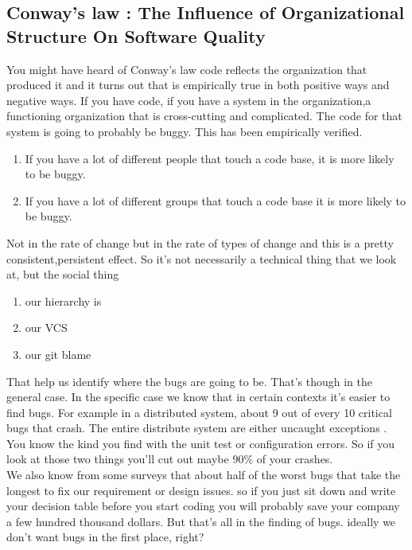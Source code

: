 \documentclass[14pt]{extreport}
\begin{document}
\subsection{Conway's law : The Influence of Organizational Structure On Software Quality}
You might have heard of Conway's law code reflects the organization that produced it and it
turns out that is empirically true in both positive ways and negative ways.
If you have code, if you have a system in the organization,a functioning organization that is cross-cutting and complicated.
The code for that system is going to probably be buggy. 
This has been empirically verified. 
\begin{enumerate}
	\item If you have a lot of different people that touch a code base, it is more likely to be buggy.
	\item If you have a lot of different groups that touch a code base it is more likely to be buggy. 
\end{enumerate}
Not in the rate of change but in the rate of types of change and this is a pretty consistent,persistent effect.
So it's not necessarily a technical thing that we look at, but the social thing
\begin{enumerate}
	\item our hierarchy is
	\item our VCS
	\item our git blame
\end{enumerate}
That help us identify where the bugs are going to be. That's though in the general case.
In the specific case we know that in certain contexts it's easier to find bugs. 
For example in a distributed system, about 9 out of every 10 critical bugs that crash.
The entire distribute system are either uncaught exceptions .
You know the kind you find with the unit test or configuration errors.
So if you look at those two things you'll cut out maybe 90\% of your crashes.
\\
We also know from some surveys that about half of the worst bugs that take the longest to fix our requirement or design issues. 
so if you just sit down and write your decision table before you start coding you will probably save your company a few hundred thousand dollars. But that's all in the finding of bugs.
ideally we don't want bugs in the first place, right? 
\end{document}
